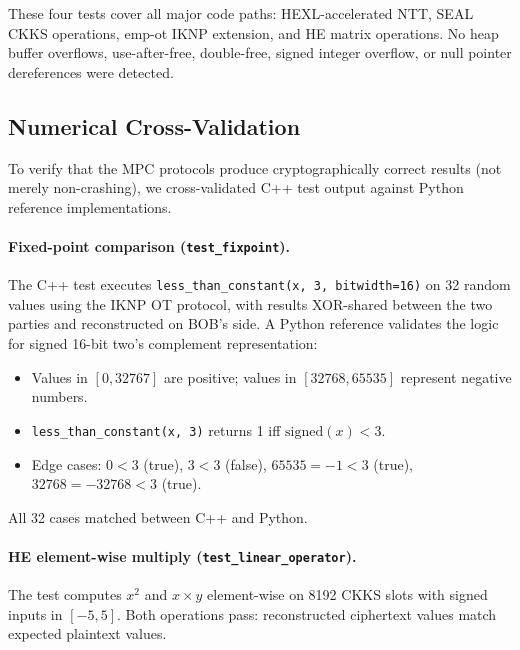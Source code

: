 These four tests cover all major code paths: HEXL-accelerated NTT, SEAL CKKS operations, emp-ot IKNP extension, and HE matrix operations.
No heap buffer overflows, use-after-free, double-free, signed integer overflow, or null pointer dereferences were detected.

\subsection{Numerical Cross-Validation}

To verify that the MPC protocols produce cryptographically correct results (not merely non-crashing), we cross-validated C++ test output against Python reference implementations.

\paragraph{Fixed-point comparison (\texttt{test\_fixpoint}).}
The C++ test executes \texttt{less\_than\_constant(x, 3, bitwidth=16)} on 32 random values using the IKNP OT protocol, with results XOR-shared between the two parties and reconstructed on BOB's side.
A Python reference validates the logic for signed 16-bit two's complement representation:
\begin{itemize}[nosep]
  \item Values in $[0, 32767]$ are positive; values in $[32768, 65535]$ represent negative numbers.
  \item \texttt{less\_than\_constant(x, 3)} returns 1 iff $\text{signed}(x) < 3$.
  \item Edge cases: $0 < 3$ (true), $3 < 3$ (false), $65535 = -1 < 3$ (true), $32768 = -32768 < 3$ (true).
\end{itemize}
All 32 cases matched between C++ and Python.

\paragraph{HE element-wise multiply (\texttt{test\_linear\_operator}).}
The test computes $x^2$ and $x \times y$ element-wise on 8192 CKKS slots with signed inputs in $[-5, 5]$.
Both operations pass: reconstructed ciphertext values match expected plaintext values.
